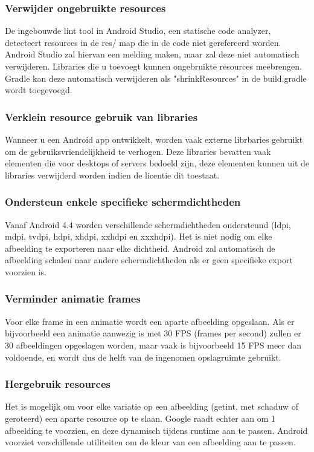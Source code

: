 \subsubsection{Verwijder ongebruikte resources}
\label{sec:removeunusedresources}
De ingebouwde lint tool in Android Studio, een statische code analyzer, detecteert resources in de res/ map die in de code niet gerefereerd worden. Android Studio zal hiervan een melding maken, maar zal deze niet automatisch verwijderen. Libraries die u toevoegt kunnen ongebruikte resources meebrengen. Gradle kan deze automatisch verwijderen als "shrinkResources" in de build.gradle wordt toegevoegd. 

\subsubsection{Verklein resource gebruik van libraries}
\label{sec:minimizeresourceslibraries}
Wanneer u een Android app ontwikkelt, worden vaak externe librbaries gebruikt om de gebruiksvriendelijkheid te verhogen. Deze libraries bevatten vaak elementen die voor desktops of servers bedoeld zijn, deze elementen kunnen uit de libraries verwijderd worden indien de licentie dit toestaat.

\subsubsection{Ondersteun enkele specifieke schermdichtheden }
\label{sec:supportspecificdensities}
Vanaf Android 4.4 worden verschillende schermdichtheden ondersteund (ldpi, mdpi, tvdpi, hdpi, xhdpi, xxhdpi en xxxhdpi). Het is niet nodig om elke afbeelding te exporteren naar elke dichtheid. Android zal automatisch de afbeelding schalen naar andere schermdichtheden als er geen specifieke export voorzien is. 

\subsubsection{Verminder animatie frames }
\label{sec:reduceanimationframes}
Voor elke frame in een animatie wordt een aparte afbeelding opgeslaan. Als er bijvoorbeeld een animatie aanwezig is met 30 FPS (frames per second) zullen er 30 afbeeldingen opgeslagen worden, maar vaak is bijvoorbeeld 15 FPS meer dan voldoende, en wordt dus de helft van de ingenomen opslagruimte gebruikt.

\subsubsection{Hergebruik resources }
\label{sec:reuseresources}
Het is mogelijk om voor elke variatie op een afbeelding (getint, met schaduw of geroteerd) een aparte resource op te slaan. Google raadt echter aan om 1 afbeelding te voorzien, en deze dynamisch tijdens runtime aan te passen. 
Android voorziet verschillende utiliteiten om de kleur van een afbeelding aan te passen.
